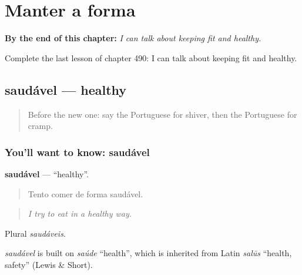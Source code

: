 
\chapter{Manter a forma}
\label{ch:pt-manter-a-forma}

\begin{chapteropening}
\textbf{By the end of this chapter:} \emph{I can talk about keeping fit and healthy.}

Complete the last lesson of chapter 490: I can talk about keeping fit and healthy.
\end{chapteropening}

\section[saudável]{saudável — healthy}

\label{lesson:PT-C490-saudavel}



\begin{quote}
Before the new one: say the Portuguese for shiver, then the Portuguese for cramp.
\end{quote}

\subsection*{You'll want to know: saudável}
\textbf{saudável} — \textquotedblleft{}healthy\textquotedblright{}.

\begin{quote}
Tento comer de forma saudável.
\end{quote}

\begin{quote}
\emph{I try to eat in a healthy way.}
\end{quote}

Plural \emph{saudáveis}.

\begin{cousinweb}
\emph{saudável} is built on \emph{saúde} \textquotedblleft{}health\textquotedblright{}, which is inherited from Latin \emph{salūs} \textquotedblleft{}health, safety\textquotedblright{} (Lewis \& Short).
\end{cousinweb}

